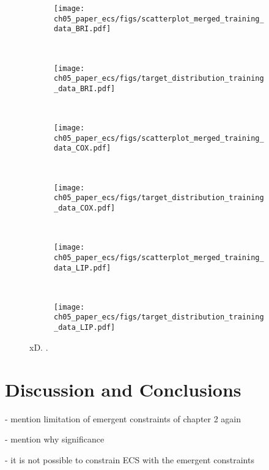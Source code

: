 \begin{figure}[p]
  \centering
  \begin{subfigure}[b]{\SubfigureWidth{}}
    \texttt{[image: 
      ch05\_paper\_ecs/figs/scatterplot\_merged\_training\_data\_BRI.pdf]}
    \caption{}
    \label{fig:05:bri_cox_lip:a}
  \end{subfigure}
  ~
  \begin{subfigure}[b]{\SubfigureWidth{}}
    \texttt{[image: 
      ch05\_paper\_ecs/figs/target\_distribution\_training\_data\_BRI.pdf]}
    \caption{}
    \label{fig:05:bri_cox_lip:b}
  \end{subfigure}
  \\
  \begin{subfigure}[b]{\SubfigureWidth{}}
    \texttt{[image: 
      ch05\_paper\_ecs/figs/scatterplot\_merged\_training\_data\_COX.pdf]}
    \caption{}
    \label{fig:05:bri_cox_lip:c}
  \end{subfigure}
  ~
  \begin{subfigure}[b]{\SubfigureWidth{}}
    \texttt{[image: 
  ch05\_paper\_ecs/figs/target\_distribution\_training\_data\_COX.pdf]}
    \caption{}
    \label{fig:05:bri_cox_lip:d}
  \end{subfigure}
  \\
  \begin{subfigure}[b]{\SubfigureWidth{}}
    \texttt{[image: 
      ch05\_paper\_ecs/figs/scatterplot\_merged\_training\_data\_LIP.pdf]}
    \caption{}
    \label{fig:05:bri_cox_lip:e}
  \end{subfigure}
  ~
  \begin{subfigure}[b]{\SubfigureWidth{}}
    \texttt{[image: 
  ch05\_paper\_ecs/figs/target\_distribution\_training\_data\_LIP.pdf]}
    \caption{}
    \label{fig:05:bri_cox_lip:f}
  \end{subfigure}
  \caption{xD. .}
  \label{fig:05:bri_cox_lip}
\end{figure}


\section{Discussion and Conclusions}
\label{sec:05:discussion_and_conclusions}

- mention limitation of emergent constraints of chapter 2 again

- mention why significance

- it is not possible to constrain ECS with the emergent constraints
